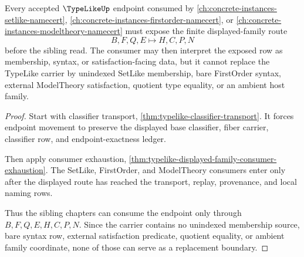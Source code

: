 \begin{theorem}
\label{thm:typelike-setlike-firstorder-modeltheory-carrier-boundary}
Every accepted $\TypeLikeUp$ endpoint consumed by \autoref{ch:concrete-instances-setlike-namecert}, \autoref{ch:concrete-instances-firstorder-namecert}, or \autoref{ch:concrete-instances-modeltheory-namecert} must expose the finite displayed-family route
$$
B,F,Q,E \longmapsto H,C,P,N
$$
before the sibling read. The consumer may then interpret the exposed row as membership, syntax, or satisfaction-facing data, but it cannot replace the TypeLike carrier by unindexed SetLike membership, bare FirstOrder syntax, external ModelTheory satisfaction, quotient type equality, or an ambient host family.
\end{theorem}
\begin{proof}
Start with classifier transport, \autoref{thm:typelike-classifier-transport}. It forces endpoint movement to preserve the displayed base classifier, fiber carrier, classifier row, and endpoint-exactness ledger.

Then apply consumer exhaustion, \autoref{thm:typelike-displayed-family-consumer-exhaustion}. The SetLike, FirstOrder, and ModelTheory consumers enter only after the displayed route has reached the transport, replay, provenance, and local naming rows.

Thus the sibling chapters can consume the endpoint only through $B,F,Q,E,H,C,P,N$. Since the carrier contains no unindexed membership source, bare syntax row, external satisfaction predicate, quotient equality, or ambient family coordinate, none of those can serve as a replacement boundary.
\end{proof}

